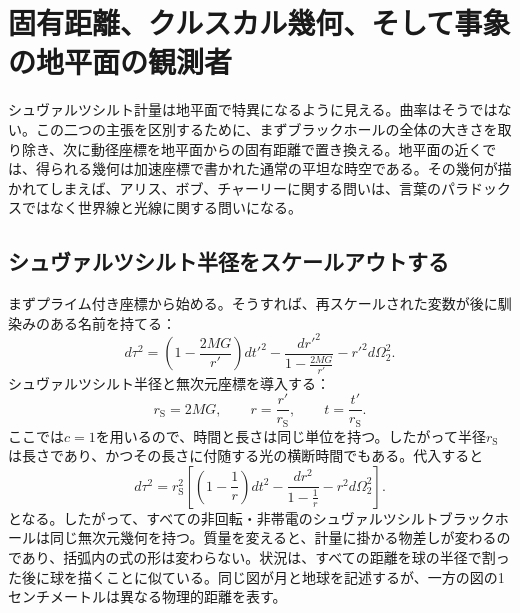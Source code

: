 \chapter{固有距離、クルスカル幾何、そして事象の地平面の観測者}

シュヴァルツシルト計量は地平面で特異になるように見える。曲率はそうではない。この二つの主張を区別するために、まずブラックホールの全体の大きさを取り除き、次に動径座標を地平面からの固有距離で置き換える。地平面の近くでは、得られる幾何は加速座標で書かれた通常の平坦な時空である。その幾何が描かれてしまえば、アリス、ボブ、チャーリーに関する問いは、言葉のパラドックスではなく世界線と光線に関する問いになる。

\section{シュヴァルツシルト半径をスケールアウトする}

まずプライム付き座標から始める。そうすれば、再スケールされた変数が後に馴染みのある名前を持てる：
\begin{equation}
d\tau^2
=
\left(1-\frac{2MG}{r'}\right)dt'^2
-
\frac{dr'^2}{1-\frac{2MG}{r'}}
-
r'^2d\Omega_2^2.
\label{eq:l7-schwarzschild-dimensional}
\end{equation}
シュヴァルツシルト半径と無次元座標を導入する：
\begin{equation}
r_{\mathrm S}=2MG,
\qquad
r=\frac{r'}{r_{\mathrm S}},
\qquad
t=\frac{t'}{r_{\mathrm S}}.
\label{eq:l7-rescaling}
\end{equation}
ここでは\(c=1\)を用いるので、時間と長さは同じ単位を持つ。したがって半径\(r_{\mathrm S}\)は長さであり、かつその長さに付随する光の横断時間でもある。代入すると
\begin{equation}
d\tau^2
=r_{\mathrm S}^2
\left[
\left(1-\frac1r\right)dt^2
-
\frac{dr^2}{1-\frac1r}
-
r^2d\Omega_2^2
\right].
\label{eq:l7-schwarzschild-rescaled}
\end{equation}
となる。したがって、すべての非回転・非帯電のシュヴァルツシルトブラックホールは同じ無次元幾何を持つ。質量を変えると、計量に掛かる物差しが変わるのであり、括弧内の式の形は変わらない。状況は、すべての距離を球の半径で割った後に球を描くことに似ている。同じ図が月と地球を記述するが、一方の図の1センチメートルは異なる物理的距離を表す。

\begin{classroomqa}
\end{classroomqa}

